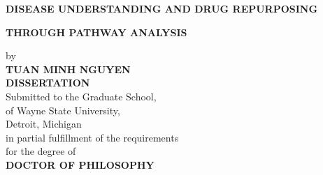 \centerline{\uppercase{\bf Disease understanding and drug repurposing}}
\vspace{-0.4cm}
\centerline{\uppercase{\bf through pathway analysis}}

\vskip-0.4cm
\thispagestyle{empty}

\begin{center}
    \vspace{-0.4cm}
    by \\
    {\bf \uppercase{Tuan Minh Nguyen}}\\ %
    {\bf \uppercase{Dissertation}}\\  %
    Submitted to the Graduate School,\\
    of Wayne State University,\\
    Detroit, Michigan\\
    in partial fulfillment of the requirements\\
    for the degree of\\
    {\bf DOCTOR OF PHILOSOPHY} %
\end{center}

